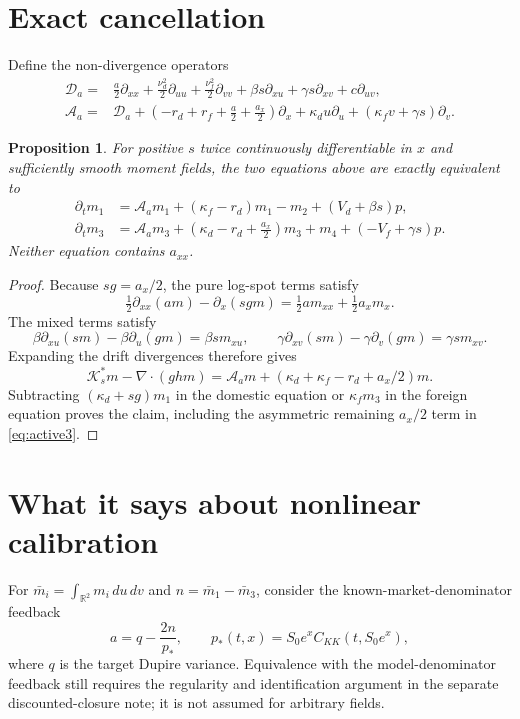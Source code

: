 \documentclass[11pt]{article}
\newtheorem{proposition}{Proposition}
\begin{document}
\section{Exact cancellation}
Define the non-divergence operators
\begin{align*}
 \mathcal D_a={}&\frac a2\partial_{xx}
 +\frac{\nu_d^2}2\partial_{uu}+\frac{\nu_f^2}2\partial_{vv}
 +\beta s\partial_{xu}+\gamma s\partial_{xv}+c\partial_{uv},\\
 \mathcal A_a={}&\mathcal D_a+
 \left(-r_d+r_f+\frac a2+\frac{a_x}2\right)\partial_x
 +\kappa_d u\partial_u+(\kappa_f v+\gamma s)\partial_v.
\end{align*}
\begin{proposition}
For positive $s$ twice continuously differentiable in $x$ and sufficiently
smooth moment fields, the two equations above are exactly equivalent to
\begin{align}
 \partial_t m_1&=\mathcal A_a m_1+(\kappa_f-r_d)m_1-m_2
                         +(V_d+\beta s)p,\label{eq:active1}\\
 \partial_t m_3&=\mathcal A_a m_3+
       \left(\kappa_d-r_d+\frac{a_x}2\right)m_3+m_4
                         +(-V_f+\gamma s)p.\label{eq:active3}
\end{align}
Neither equation contains $a_{xx}$.
\end{proposition}
\begin{proof}
Because $sg=a_x/2$, the pure log-spot terms satisfy
\[
 \tfrac12\partial_{xx}(am)-\partial_x(sgm)
       =\tfrac12a m_{xx}+\tfrac12a_xm_x.
\]
The mixed terms satisfy
\[
 \beta\partial_{xu}(sm)-\beta\partial_u(gm)=\beta s m_{xu},
 \qquad
 \gamma\partial_{xv}(sm)-\gamma\partial_v(gm)=\gamma s m_{xv}.
\]
Expanding the drift divergences therefore gives
\[
 \mathcal K_s^*m-\nabla\cdot(ghm)
 =\mathcal A_am+
 (\kappa_d+\kappa_f-r_d+a_x/2)m.
\]
Subtracting $(\kappa_d+sg)m_1$ in the domestic equation or $\kappa_fm_3$
in the foreign equation proves the claim, including the asymmetric remaining
$a_x/2$ term in \eqref{eq:active3}.
\end{proof}

\section{What it says about nonlinear calibration}
For $\bar m_i=\int_{\mathbb R^2}m_i\,du\,dv$ and
$n=\bar m_1-\bar m_3$, consider the known-market-denominator feedback
\[
 a=q-\frac{2n}{p_*},\qquad
 p_*(t,x)=S_0e^x C_{KK}(t,S_0e^x),
\]
where $q$ is the target Dupire variance. Equivalence with the model-denominator
feedback still requires the regularity and identification argument in the
separate discounted-closure note; it is not assumed for arbitrary fields.
\end{document}

